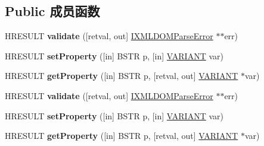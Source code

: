 \subsection*{Public 成员函数}
\begin{DoxyCompactItemize}
\item 
\mbox{\label{interface_m_s_x_m_l2_1_1_i_x_m_l_d_o_m_document2_acd518253451599943965e3b79081fd74}} 
H\+R\+E\+S\+U\+LT {\bfseries validate} (\mbox{[}retval, out\mbox{]} \hyperlink{interface_m_s_x_m_l2_1_1_i_x_m_l_d_o_m_parse_error}{I\+X\+M\+L\+D\+O\+M\+Parse\+Error} $\ast$$\ast$err)
\item 
\mbox{\label{interface_m_s_x_m_l2_1_1_i_x_m_l_d_o_m_document2_afcfc4eba981704907af7831e70963782}} 
H\+R\+E\+S\+U\+LT {\bfseries set\+Property} (\mbox{[}in\mbox{]} B\+S\+TR p, \mbox{[}in\mbox{]} \hyperlink{structtag_v_a_r_i_a_n_t}{V\+A\+R\+I\+A\+NT} var)
\item 
\mbox{\label{interface_m_s_x_m_l2_1_1_i_x_m_l_d_o_m_document2_aa464ff90df7aa1063e210f54ba4477c8}} 
H\+R\+E\+S\+U\+LT {\bfseries get\+Property} (\mbox{[}in\mbox{]} B\+S\+TR p, \mbox{[}retval, out\mbox{]} \hyperlink{structtag_v_a_r_i_a_n_t}{V\+A\+R\+I\+A\+NT} $\ast$var)
\item 
\mbox{\label{interface_m_s_x_m_l2_1_1_i_x_m_l_d_o_m_document2_acd518253451599943965e3b79081fd74}} 
H\+R\+E\+S\+U\+LT {\bfseries validate} (\mbox{[}retval, out\mbox{]} \hyperlink{interface_m_s_x_m_l2_1_1_i_x_m_l_d_o_m_parse_error}{I\+X\+M\+L\+D\+O\+M\+Parse\+Error} $\ast$$\ast$err)
\item 
\mbox{\label{interface_m_s_x_m_l2_1_1_i_x_m_l_d_o_m_document2_afcfc4eba981704907af7831e70963782}} 
H\+R\+E\+S\+U\+LT {\bfseries set\+Property} (\mbox{[}in\mbox{]} B\+S\+TR p, \mbox{[}in\mbox{]} \hyperlink{structtag_v_a_r_i_a_n_t}{V\+A\+R\+I\+A\+NT} var)
\item 
\mbox{\label{interface_m_s_x_m_l2_1_1_i_x_m_l_d_o_m_document2_aa464ff90df7aa1063e210f54ba4477c8}} 
H\+R\+E\+S\+U\+LT {\bfseries get\+Property} (\mbox{[}in\mbox{]} B\+S\+TR p, \mbox{[}retval, out\mbox{]} \hyperlink{structtag_v_a_r_i_a_n_t}{V\+A\+R\+I\+A\+NT} $\ast$var)

\end{DoxyCompactItemize}
